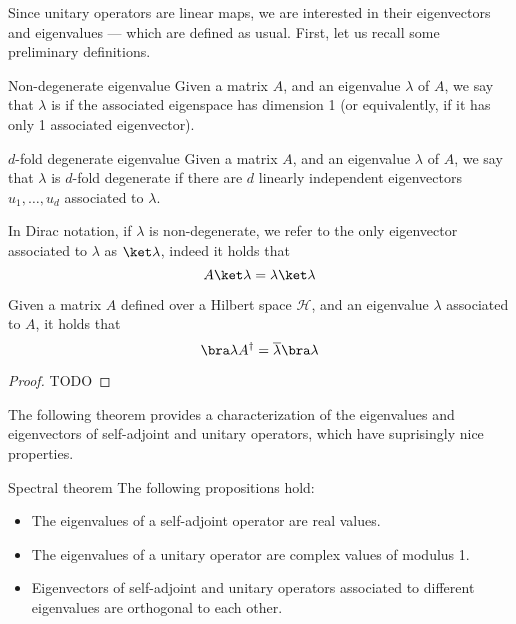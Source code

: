 \documentclass[a4paper, 12pt]{report}
\begin{document}
Since unitary operators are linear maps, we are interested in their eigenvectors and eigenvalues --- which are defined as usual. First, let us recall some preliminary definitions.

\begin{frameddefn}{Non-degenerate eigenvalue}
	Given a matrix $A$, and an eigenvalue $\lambda$ of $A$, we say that $\lambda$ is  if the associated eigenspace has dimension 1 (or equivalently, if it has only 1 associated eigenvector).
\end{frameddefn}

\begin{frameddefn}{$d$-fold degenerate eigenvalue}
	Given a matrix $A$, and an eigenvalue $\lambda$ of $A$, we say that $\lambda$ is $d$-fold degenerate if there are $d$ linearly independent eigenvectors $u_1, \ldots, u_d$ associated to $\lambda$.
\end{frameddefn}

In Dirac notation, if $\lambda$ is non-degenerate, we refer to the only eigenvector associated to $\lambda$ as $\ket \lambda$, indeed it holds that $$A \ket \lambda = \lambda \ket \lambda$$

\begin{framedprop}{}
	Given a matrix $A$ defined over a Hilbert space $\mathcal H$, and an eigenvalue $\lambda$ associated to $A$, it holds that $$\bra \lambda A^\dag = \overline \lambda \bra \lambda$$
\end{framedprop}

\begin{proof}
	TODO 
\end{proof}

The following theorem provides a characterization of the eigenvalues and eigenvectors of self-adjoint and unitary operators, which have suprisingly nice properties.

\begin{framedthm}{Spectral theorem}
	The following propositions hold:

	\begin{itemize}
		\item The eigenvalues of a self-adjoint operator are real values.
		\item The eigenvalues of a unitary operator are complex values of modulus 1.
		\item Eigenvectors of self-adjoint and unitary operators associated to different eigenvalues are orthogonal to each other.
	\end{itemize}
\end{framedthm}
\end{document}
